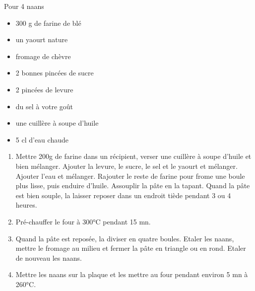 {Pour 4 naans}{\begin{itemize}
	\item 300 g de farine de blé
	\item un yaourt nature
	\item fromage de chèvre
	\item 2 bonnes pincées de sucre
	\item 2 pincées de levure
	\item du sel à votre goût
	\item une cuillère à soupe d’huile
	\item 5 cl d’eau chaude
\end{itemize}}
{\begin{enumerate}
	\item Mettre 200g de farine dans un récipient, verser une cuillère à soupe d’huile et bien mélanger. Ajouter la levure, le sucre, le sel et le yaourt et mélanger. Ajouter l’eau et mélanger. Rajouter le reste de farine pour frome une boule plus lisse, puis enduire d’huile. Assouplir la pâte en la tapant. Quand la pâte est bien souple, la laisser reposer dans un endroit tiède pendant 3 ou 4 heures. 
	\item Pré-chauffer le four à 300°C pendant 15 mn.
	\item Quand la pâte est reposée, la diviser en quatre boules. Etaler les naans, mettre le fromage au milieu et fermer la pâte en triangle ou en rond. Etaler de nouveau les naans. 
	\item Mettre les naans sur la plaque et les mettre au four pendant environ 5 mn à 260°C.
\end{enumerate}}

